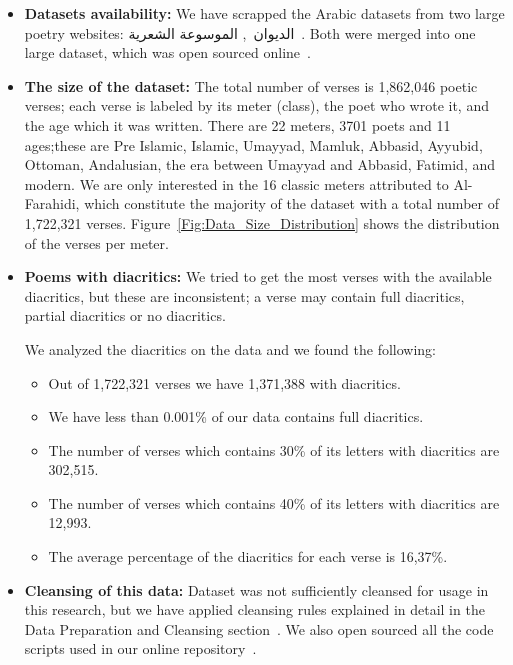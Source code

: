 \begin{itemize}

 \item \textbf{Datasets availability:} We have scrapped the Arabic datasets from two large poetry websites: \textarabic{الديوان}~\cite{diwan}, \textarabic{الموسوعة الشعرية}~\cite{PoetryEncyclopedia2016}. Both were merged into one large dataset, which was open sourced online~\cite{ArabicpoetryDS}.

 \item \textbf{The size of the dataset:} The total number of verses is 1,862,046 poetic verses; each verse is labeled by its meter (class), the poet who wrote it, and the age which it was written. There are 22 meters, 3701 poets and 11 ages;these are Pre Islamic, Islamic, Umayyad, Mamluk, Abbasid, Ayyubid, Ottoman, Andalusian, the era between Umayyad and Abbasid, Fatimid, and modern. We are only interested in the 16 classic meters attributed to Al-Farahidi, which constitute the majority of the dataset with a total number of 1,722,321 verses. Figure~\ref{Fig:Data_Size_Distribution} shows the distribution of the verses per meter. %
 
  \item \textbf{Poems with diacritics:} We tried to get the most verses with the available diacritics, but these are inconsistent; a verse may contain full diacritics, partial diacritics or no diacritics.{\color{red} We analyzed the diacritics on the data and we found the following:
  \begin{itemize}
  	\item Out of 1,722,321 verses we have 1,371,388 with diacritics.
  	\item We have less than 0.001\% of our data contains full diacritics.
  	\item The number of verses which contains 30\% of its letters with diacritics are 302,515.
  	\item The number of verses which contains 40\% of its letters with diacritics are 12,993.
  	\item The average percentage of the diacritics for each verse is 16,37\%.
  \end{itemize}
}
 
 \item \textbf{Cleansing of this data:} Dataset was not sufficiently cleansed for usage in this research, but we have applied cleansing rules explained in detail in the Data Preparation and Cleansing section~. We also open sourced all the code scripts used in our online repository~\cite{HCILAB_ArabicPoetry_2018}.
\end{itemize}

